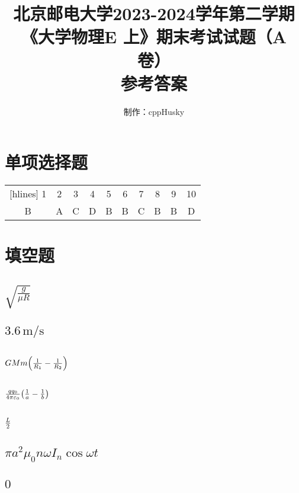 \documentclass[12pt]{ctexart}
\title{北京邮电大学2023-2024学年第二学期\\《大学物理E 上》期末考试试题（A卷）\\参考答案}
\author{制作：cppHusky}
\date{}
\begin{document}
\pagestyle{fancy}
\fancyhf{}
\maketitle
\thispagestyle{fancy}
\section{单项选择题}
\begin{table}[H]
	\centering
	\begin{NiceTabular}{*{10}{c}}[hlines]
		1 & 2 & 3 & 4 & 5 & 6 & 7 & 8 & 9 & 10 \\
		B & A & C & D & B & B & C & B & B & D
	\end{NiceTabular}
\end{table}
\section{填空题}
\subsection{$\sqrt{\frac{g}{\mu R}}$}
\subsection{$3.6\,\mathrm{m/s}$}
\subsection{$GMm\qty(\frac{1}{R_1}-\frac{1}{R_2})$}
\subsection{$\frac{qq_0}{4\pi\varepsilon_0}\qty(\frac{1}{a}-\frac{1}{b})$}
\subsection{$L\over2$}
\subsection{$\pi a^{2}\mu_{0}n\omega I_{n}\cos{\omega t}$}
\subsection{$0$}
\end{document}

